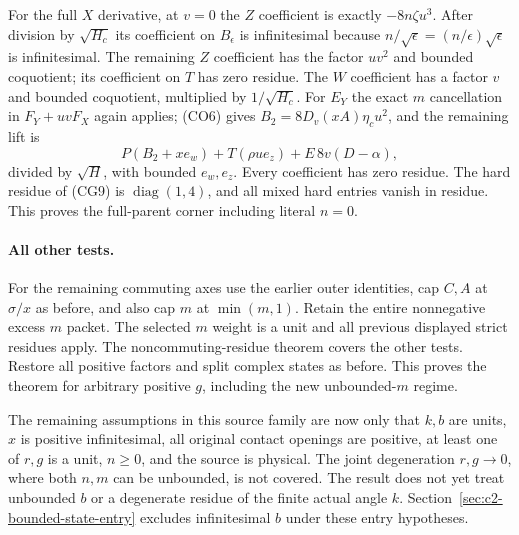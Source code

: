 For the full $X$ derivative, at $v=0$ the $Z$ coefficient is exactly
$-8n\zeta u^3$.  After division by $\sqrt{H_c}$ its coefficient
on $B_\epsilon$ is infinitesimal because
$n/\sqrt\epsilon=(n/\epsilon)\sqrt\epsilon$ is infinitesimal.
The remaining $Z$ coefficient has the factor $uv^2$ and bounded
coquotient; its coefficient on $T$ has zero residue.  The $W$
coefficient has a factor $v$ and bounded coquotient, multiplied by
$1/\sqrt{H_c}$.  For $E_Y$ the exact $m$ cancellation in
$F_Y+uvF_X$ again applies; (CO6) gives
$B_2=8D_v(xA)\eta_c u^2$, and the remaining lift is
\[
 P(B_2+xe_w)+T(\rho u e_z)+E\,8v(D-\alpha),
\]
divided by $\sqrt H$, with bounded $e_w,e_z$.
Every coefficient has zero residue.  The hard residue of (CG9) is
$\operatorname{diag}(1,4)$, and all mixed hard entries vanish in
residue.  This proves the full-parent corner including literal $n=0$.

\paragraph{All other tests.}
For the remaining commuting axes use the earlier outer identities,
cap $C,A$ at $\sigma/x$ as before, and also cap $m$ at
$\min(m,1)$.  Retain the entire nonnegative excess $m$ packet.
The selected $m$ weight is a unit and all previous displayed
strict residues apply.  The noncommuting-residue theorem covers
the other tests.  Restore all positive factors and split complex
states as before.  This proves the theorem for arbitrary positive
$g$, including the new unbounded-$m$ regime.

The remaining assumptions in this source family are now only that
$k,b$ are units, $x$ is positive infinitesimal, all original contact
openings are positive, at least one of $r,g$ is a unit, $n\geq0$,
and the source is physical.  The joint degeneration $r,g\to0$,
where both $n,m$ can be unbounded, is not covered.  The
result does not yet treat unbounded $b$ or a degenerate residue of
the finite actual angle $k$.  Section~\ref{sec:c2-bounded-state-entry}
excludes infinitesimal $b$ under these entry hypotheses.
